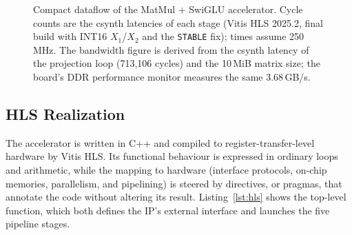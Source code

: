 \begin{figure}[htb!]
\caption{Compact dataflow of the MatMul + SwiGLU accelerator. Cycle counts are the
csynth latencies of each stage (Vitis HLS 2025.2, final build with INT16 $X_1$/$X_2$ and
the \texttt{STABLE} fix); times assume 250\,MHz. The bandwidth figure is derived from the
csynth latency of the projection loop (713,106 cycles) and the 10\,MiB matrix size; the
board's DDR performance monitor measures the same 3.68\,GB/s.}
\label{fig:swiglu_compact}
\end{figure}

\subsection{HLS Realization}
\label{subsec:hls}

The accelerator is written in C++ and compiled to register-transfer-level hardware by
Vitis HLS. Its functional behaviour is expressed in ordinary loops and arithmetic, while
the mapping to hardware (interface protocols, on-chip memories, parallelism, and
pipelining) is steered by directives, or pragmas, that annotate the code without altering
its result. Listing~\ref{lst:hls} shows the top-level function, which both defines the
IP's external interface and launches the five pipeline stages.

